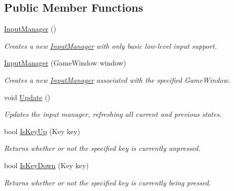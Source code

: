 \subsection*{Public Member Functions}
\begin{DoxyCompactItemize}
\item 
\hyperlink{class_tri_devs_1_1_tri_engine2_d_1_1_input_1_1_input_manager_a571560933e4735d1393f697d19048b50}{Input\-Manager} ()
\begin{DoxyCompactList}\small\item\em Creates a new \hyperlink{class_tri_devs_1_1_tri_engine2_d_1_1_input_1_1_input_manager}{Input\-Manager} with only basic low-\/level input support. \end{DoxyCompactList}\item 
\hyperlink{class_tri_devs_1_1_tri_engine2_d_1_1_input_1_1_input_manager_a02702caed51c03cab2ec810cfa4b3301}{Input\-Manager} (Game\-Window window)
\begin{DoxyCompactList}\small\item\em Creates a new \hyperlink{class_tri_devs_1_1_tri_engine2_d_1_1_input_1_1_input_manager}{Input\-Manager} associated with the specified Game\-Window. \end{DoxyCompactList}\item 
void \hyperlink{class_tri_devs_1_1_tri_engine2_d_1_1_input_1_1_input_manager_a5ef0bd64a85fdafc34324cf231038302}{Update} ()
\begin{DoxyCompactList}\small\item\em Updates the input manager, refreshing all current and previous states. \end{DoxyCompactList}\item 
bool \hyperlink{class_tri_devs_1_1_tri_engine2_d_1_1_input_1_1_input_manager_a158e8ca55c8c2f972c791204cbac1b06}{Is\-Key\-Up} (Key key)
\begin{DoxyCompactList}\small\item\em Returns whether or not the specified key is currently unpressed. \end{DoxyCompactList}\item 
bool \hyperlink{class_tri_devs_1_1_tri_engine2_d_1_1_input_1_1_input_manager_a22a6938da450c2606ea779e980a33dbb}{Is\-Key\-Down} (Key key)
\begin{DoxyCompactList}\small\item\em Returns whether or not the specified key is currently being pressed. \end{DoxyCompactList}\item 

\end{DoxyCompactItemize}
